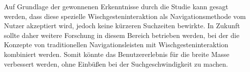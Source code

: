\documentclass[11pt,a4paper]{report}
\begin{document}
Auf Grundlage der gewonnenen Erkenntnisse durch die Studie kann gesagt werden, dass diese spezielle Wischgesteninteraktion als Navigationsmethode vom Nutzer akzeptiert wird, jedoch keine kürzeren Suchzeiten bewirkte. In Zukunft sollte daher weitere Forschung in diesem Bereich betrieben werden, bei der die Konzepte von traditionellen Navigationsleisten mit Wischgesteninteraktion kombiniert werden. Somit könnte das Benutzererlebnis für die breite Masse verbessert werden, ohne Einbüßen bei der Suchgeschwindigkeit zu machen.








\clearemptydoublepage
{}

	
\end{document}
